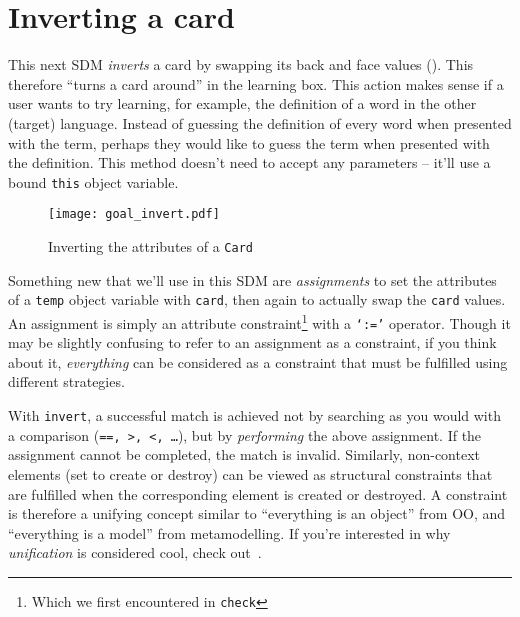 \newpage
\hypertarget{sec:invertCard}{}
\section{Inverting a card}
\genHeader

This next SDM \emph{inverts} a card by swapping its back and face values (). This therefore ``turns a card around'' in the learning
box. This action makes sense if a user wants to try learning, for example, the definition of a word in the other (target) language. Instead of guessing the
definition of every word when presented with the term, perhaps they would like to guess the term when presented with the definition. This method doesn't need to
accept any parameters -- it'll use a bound \texttt{this} object variable.

\vspace{0.5cm}

\begin{figure}[htbp]
	\centering
    \texttt{[image: goal\_invert.pdf]}
 	\caption{Inverting the attributes of a \texttt{Card}}
 	\label{fig:goal_invert}
\end{figure}
\FloatBarrier

Something new that we'll use in this SDM are \emph{assignments} to set the attributes of a \texttt{temp} object variable with \texttt{card},
then again to actually swap the \texttt{card} values. An assignment is simply an attribute constraint\footnote{Which we first encountered in \texttt{check}}
with a \texttt{`:='} operator. Though it may be slightly confusing to refer to an assignment as a constraint, if you think about it, \emph{everything} can be
considered as a constraint that must be fulfilled using different strategies.

With \texttt{invert}, a successful match is achieved not by searching as you would with a comparison (\texttt{==, >, <, \ldots}), but by \emph{performing} the
above assignment. If the assignment cannot be completed, the match is invalid. Similarly, non-context elements (set to create or destroy) can be viewed as
structural constraints that are fulfilled when the corresponding element is created or destroyed.  A constraint is therefore a unifying concept similar to
``everything is an object'' from OO, and ``everything is a model'' from metamodelling.  If you're interested in why \emph{unification} is considered cool, check
out~\cite{BEZ05}.





